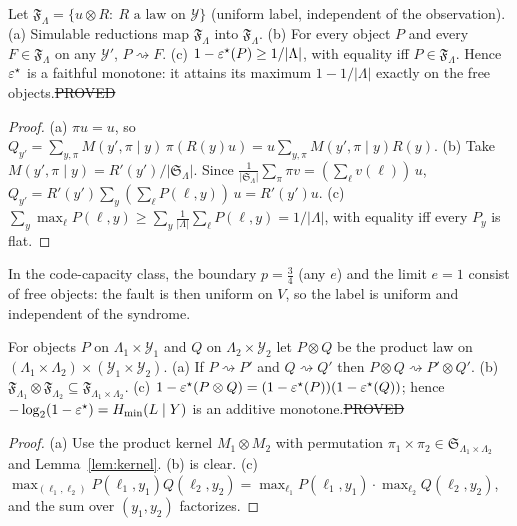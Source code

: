 \begin{proposition}\label{prop:free-obj}
Let $\mathfrak F_\Lambda=\{u\otimes R:\ R\text{ a law on }\mathcal Y\}$ (uniform label, independent of the observation).
(a) Simulable reductions map $\mathfrak F_\Lambda$ into $\mathfrak F_\Lambda$.
(b) For every object $P$ and every $F\in\mathfrak F_\Lambda$ on any $\mathcal Y'$, $P\rightsquigarrow F$.
(c) $1-\varepsilon^{\star}(P)\ge1/|\Lambda|$, with equality iff $P\in\mathfrak F_\Lambda$. Hence $\varepsilon^{\star}$ is a faithful monotone: it attains its maximum $1-1/|\Lambda|$ exactly on the free objects.\hfill\st{PROVED}
\end{proposition}
\begin{proof}
(a) $\pi u=u$, so $Q_{y'}=\sum_{y,\pi}M(y',\pi\mid y)\,\pi(R(y)u)=u\sum_{y,\pi}M(y',\pi\mid y)R(y)$.
(b) Take $M(y',\pi\mid y)=R'(y')/|\mathfrak S_\Lambda|$. Since $\frac1{|\mathfrak S_\Lambda|}\sum_\pi\pi v=(\sum_\ell v(\ell))\,u$, $Q_{y'}=R'(y')\sum_y(\sum_\ell P(\ell,y))\,u=R'(y')u$.
(c) $\sum_y\max_\ell P(\ell,y)\ge\sum_y\frac1{|\Lambda|}\sum_\ell P(\ell,y)=1/|\Lambda|$, with equality iff every $P_y$ is flat.
\end{proof}

In the code-capacity class, the boundary $p=\tfrac34$ (any $e$) and the limit $e=1$ consist of free objects: the fault is then uniform on $V$, so the label is uniform and independent of the syndrome.

\begin{proposition}\label{prop:tensor}
For objects $P$ on $\Lambda_1\times\mathcal Y_1$ and $Q$ on $\Lambda_2\times\mathcal Y_2$ let $P\otimes Q$ be the product law on $(\Lambda_1\times\Lambda_2)\times(\mathcal Y_1\times\mathcal Y_2)$.
(a) If $P\rightsquigarrow P'$ and $Q\rightsquigarrow Q'$ then $P\otimes Q\rightsquigarrow P'\otimes Q'$. (b) $\mathfrak F_{\Lambda_1}\otimes\mathfrak F_{\Lambda_2}\subseteq\mathfrak F_{\Lambda_1\times\Lambda_2}$.
(c) $1-\varepsilon^{\star}(P\otimes Q)=(1-\varepsilon^{\star}(P))(1-\varepsilon^{\star}(Q))$; hence $-\log_2(1-\varepsilon^{\star})=H_{\min}(L\mid Y)$ is an additive monotone.\hfill\st{PROVED}
\end{proposition}
\begin{proof}
(a) Use the product kernel $M_1\otimes M_2$ with permutation $\pi_1\times\pi_2\in\mathfrak S_{\Lambda_1\times\Lambda_2}$ and Lemma~\ref{lem:kernel}. (b) is clear. (c) $\max_{(\ell_1,\ell_2)}P(\ell_1,y_1)Q(\ell_2,y_2)=\max_{\ell_1}P(\ell_1,y_1)\cdot\max_{\ell_2}Q(\ell_2,y_2)$, and the sum over $(y_1,y_2)$ factorizes.
\end{proof}

